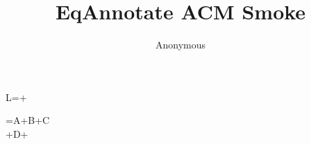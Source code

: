 \documentclass[sigconf,nonacm]{acmart}
\begin{document}
\title{EqAnnotate ACM Smoke}\author{Anonymous}\maketitle
\begin{annotatedequation}[numbered]
\mathcal L=+\lambda{}\label{eq:acm}
\end{annotatedequation}

\begin{annotatedmultline}
=A+B+C\\
{}+D+
\end{annotatedmultline}
\end{document}
